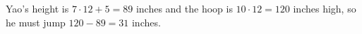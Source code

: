 Yao's height is $7\cdot12+5=89$ inches and the hoop is $10\cdot12=120$ inches high, so he must jump $120-89=\boxed{31}$ inches.
